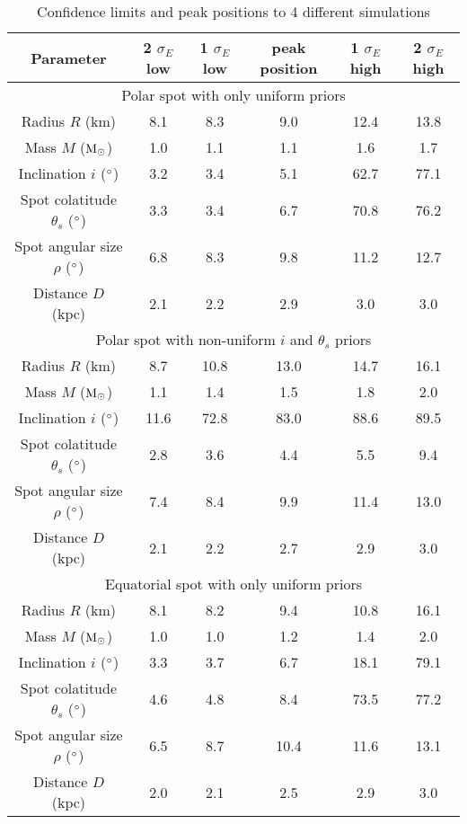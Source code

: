 \documentclass{wihuri}
\def\msun{{\rm M_{\odot}}}
\def\thetas{\theta_{s}}
\begin{document}
\begin{center}
\begin{table}
  \caption{Confidence limits and peak positions to 4 different simulations}
\label{table:params}
\begin{center}
  \begin{tabular}{| c | c | c | c | c | c |}
    \hline
     Parameter & 2 $\sigma_{E}$ low & 1 $\sigma_{E}$ low & peak position &1 $\sigma_{E}$ high & 2 $\sigma_{E}$ high \\ \hline
     \multicolumn{6}{c}{Polar spot with only uniform priors} \\ \hline
      Radius $R$ (km) & 8.1 & 8.3 & 9.0 & 12.4 & 13.8  \\ \hline
      Mass $M$ ($\msun$) & 1.0 & 1.1 & 1.1 & 1.6 & 1.7  \\ \hline
      Inclination $i$ ($\degree$) & 3.2 & 3.4 & 5.1 & 62.7 & 77.1 \\ \hline
      Spot colatitude $\thetas$ ($\degree$) & 3.3 & 3.4 & 6.7 & 70.8 & 76.2 \\ \hline
      Spot angular size $\rho$ ($\degree$) & 6.8 & 8.3 & 9.8 & 11.2 & 12.7 \\ \hline
      Distance $D$ (kpc) & 2.1 & 2.2 & 2.9 & 3.0 & 3.0 \\   \hline
      
      \multicolumn{6}{c}{Polar spot with non-uniform $i$ and $\thetas$ priors} \\ \hline
      Radius $R$ (km) & 8.7 & 10.8 & 13.0 & 14.7 & 16.1  \\ \hline
      Mass $M$ ($\msun$) & 1.1 & 1.4 & 1.5 & 1.8 & 2.0  \\ \hline
      Inclination $i$ ($\degree$) & 11.6 & 72.8 & 83.0 & 88.6 & 89.5 \\ \hline
      Spot colatitude $\thetas$ ($\degree$) & 2.8 & 3.6 & 4.4 & 5.5 & 9.4 \\ \hline
      Spot angular size $\rho$ ($\degree$) & 7.4 & 8.4 & 9.9 & 11.4 & 13.0 \\ \hline
      Distance $D$ (kpc) & 2.1 & 2.2 & 2.7 & 2.9 & 3.0 \\ \hline
      
      \multicolumn{6}{c}{Equatorial spot with only uniform priors} \\ \hline
      Radius $R$ (km) & 8.1 & 8.2 & 9.4 & 10.8 & 16.1  \\ \hline
      Mass $M$ ($\msun$) & 1.0 & 1.0 & 1.2 & 1.4 & 2.0  \\ \hline
      Inclination $i$ ($\degree$) & 3.3 & 3.7 & 6.7 & 18.1 & 79.1 \\ \hline
      Spot colatitude $\thetas$ ($\degree$) & 4.6 & 4.8 & 8.4 & 73.5 & 77.2 \\ \hline
      Spot angular size $\rho$ ($\degree$) & 6.5 & 8.7 & 10.4 & 11.6 & 13.1 \\ \hline
      Distance $D$ (kpc) &  2.0 & 2.1 & 2.5 & 2.9 & 3.0 \\ \hline
      

\end{tabular}
\end{center}
\end{table}
\end{center}
\end{document}
